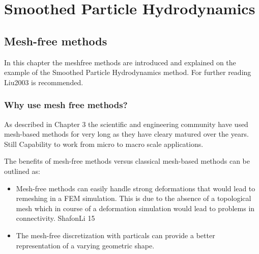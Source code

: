 %
%
%


\chapter{Smoothed Particle Hydrodynamics} %

\label{Chapter 5} %


\section{Mesh-free methods}
In this chapter the meshfree methods are introduced and explained on the example of the Smoothed Particle
Hydrodynamics method. For further reading Liu2003 is recommended.

\subsection{Why use mesh free methods?}

As described in Chapter 3 the scientific and engineering community have used mesh-based methods for
very long as they have cleary matured over the years. Still
Capability to work from
micro to macro scale applications.

The benefits of mesh-free methods versus classical mesh-based methods can be outlined as:
\begin{itemize}
\item Mesh-free methods can easily handle strong deformations that would lead to
remeshing in a FEM simulation. This is due to the absence of a topological mesh which in course
of a deformation simulation would lead to problems in connectivity. ShafonLi 15
\item The mesh-free discretization with particals can provide a better representation of a varying
geometric shape.
\end{itemize}

